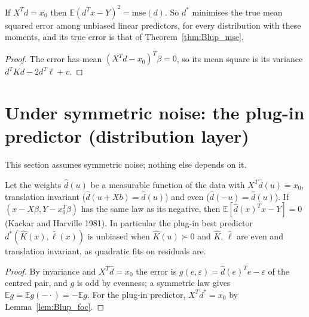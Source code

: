 \begin{theorem}\label{thm:Blup_mse_true}
  \leanok
  If $X^Td = x_0$ then $\mathbb E(d^Tx - Y)^2 = \mathrm{mse}(d)$. So $d^*$ minimises the true
  mean squared error among unbiased linear predictors, for every distribution with these
  moments, and its true error is that of Theorem~\ref{thm:Blup_mse}.
\end{theorem}
\begin{proof}
  \leanok
  The error has mean $(X^Td - x_0)^T\beta = 0$, so its mean square is its variance
  $d^TKd - 2d^T\ell + v$.
\end{proof}

\section*{Under symmetric noise: the plug-in predictor (distribution layer)}

This section assumes symmetric noise; nothing else depends on it.

\begin{theorem}\label{thm:Blup_plugIn}
  \leanok
  Let the weights $\hat d(u)$ be a measurable function of the data with $X^T\hat d(u) = x_0$,
  translation invariant ($\hat d(u + Xb) = \hat d(u)$) and even ($\hat d(-u) = \hat d(u)$). If
  $(x - X\beta, Y - x_0^T\beta)$ has the same law as its negative, then
  $\mathbb E[\hat d(x)^Tx - Y] = 0$ (Kackar and Harville 1981). In particular the plug-in best
  predictor $d^*(\hat K(x), \hat\ell(x))$ is unbiased when $\hat K(u) \succ 0$ and
  $\hat K$, $\hat\ell$ are even and translation invariant, as quadratic fits on residuals are.
\end{theorem}
\begin{proof}
  \leanok
  By invariance and $X^T\hat d = x_0$ the error is $g(e, \varepsilon) = \hat d(e)^Te - \varepsilon$
  of the centred pair, and $g$ is odd by evenness; a symmetric law gives
  $\mathbb E g = \mathbb E g(-\cdot) = -\mathbb E g$. For the plug-in predictor,
  $X^Td^* = x_0$ by Lemma~\ref{lem:Blup_foc}.
\end{proof}

